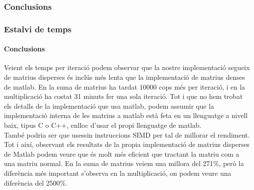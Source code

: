 \documentclass[8pt]{beamer}
\begin{document}
\subsubsection{Conclusions}
\begin{frame}
  \frametitle{Estalvi de temps}
  \framesubtitle{Conclusions}
Veient els temps per iteració podem observar que la nostre implementació segueix de matrius disperses és inclús més lenta que la implementació de matrius denses de matlab. En la suma de matrius ha tardat 10000 cops més per iteració, i en la multiplicació ha costat 31 minuts fer una sola iteració.
Tot i que no hem trobat els detalls de la implementació que usa matlab, podem assumir que la implementació interna de les matrius a matlab està feta en un llenguatge a nivell baix, tipus C o C++, enlloc d'usar el propi llenguatge de matlab.\\ 
També podria ser que usessin instruccions SIMD per tal de millorar el rendiment. \\

Tot i així, observant els resultats de la propia implementació de matrius disperses de Matlab podem veure que és molt més eficient que tractant la matriu com a una matriu normal.
En la suma de matrius veiem una millora del 271\%, però la diferència més important s'observa en la multiplicació, on podem veure una diferència del 2500\%.
\end{frame}
    
\end{document}
